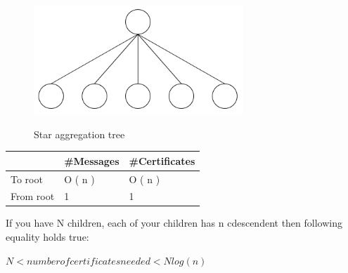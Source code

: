	\begin{figure}[t]\label{star-aggregation-tree}
		\centering
			\includegraphics[width=0.7\textwidth]{images/star-aggregation-tree.png}\\
			\caption{Star aggregation tree}
	\end{figure}
	\begin{tabular}{ | l | l | l |}
		\hline
			\ & \#Messages & \#Certificates \\
		\hline
			To root	& O ( n ) & O ( n ) \\
		\hline
			From root & 1 & 1 \\
		\hline 
	\end{tabular}
		\newline
		\newline


If you have N children, each of your children has n cdescendent then following equality holds true:

$ N < number of certificates needed < N log(n) $